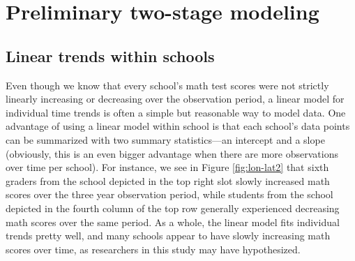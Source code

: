 \documentclass[
]{krantz}
\begin{document}
\hypertarget{twostage9}{%
\section{Preliminary two-stage modeling}\label{twostage9}}

\hypertarget{lineartwostage}{%
\subsection{Linear trends within schools}\label{lineartwostage}}

Even though we know that every school's math test scores were not strictly linearly increasing or decreasing over the observation period, a linear model for individual time trends is often a simple but reasonable way to model data. One advantage of using a linear model within school is that each school's data points can be summarized with two summary statistics---an intercept and a slope (obviously, this is an even bigger advantage when there are more observations over time per school). For instance, we see in Figure \ref{fig:lon-lat2} that sixth graders from the school depicted in the top right slot slowly increased math scores over the three year observation period, while students from the school depicted in the fourth column of the top row generally experienced decreasing math scores over the same period. As a whole, the linear model fits individual trends pretty well, and many schools appear to have slowly increasing math scores over time, as researchers in this study may have hypothesized.
\end{document}
